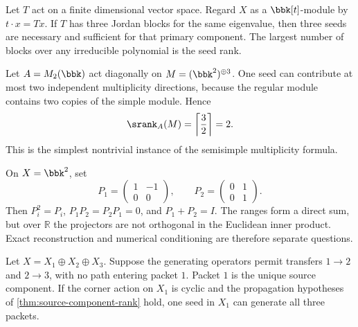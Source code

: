 \begin{microexample}[title={R1: one operator with several primary blocks}]
Let \(T\) act on a finite dimensional vector space.  Regard \(X\) as a \(\bbk[t]\)-module by \(t\cdot x=Tx\).  If \(T\) has three Jordan blocks for the same eigenvalue, then three seeds are necessary and sufficient for that primary component.  The largest number of blocks over any irreducible polynomial is the seed rank.
\end{microexample}

\begin{microexample}[title={R2: a matrix algebra with multiplicity}]
Let \(A=M_2(\bbk)\) act diagonally on \(M=(\bbk^2)^{\oplus3}\).  One seed can contribute at most two independent multiplicity directions, because the regular module contains two copies of the simple module.  Hence
\[
\srank_A(M)=\left\lceil\frac{3}{2}\right\rceil=2.
\]
This is the simplest nontrivial instance of the semisimple multiplicity formula.
\end{microexample}

\begin{microexample}[title={R3: an exact but oblique packet split}]
On \(X=\bbk^2\), set
\[
P_1=\begin{pmatrix}1&-1\\0&0\end{pmatrix},
\qquad
P_2=\begin{pmatrix}0&1\\0&1\end{pmatrix}.
\]
Then \(P_i^2=P_i\), \(P_1P_2=P_2P_1=0\), and \(P_1+P_2=I\).  The ranges form a direct sum, but over \(\mathbb R\) the projectors are not orthogonal in the Euclidean inner product.  Exact reconstruction and numerical conditioning are therefore separate questions.
\end{microexample}

\begin{microexample}[title={R4: a directed packet system}]
Let \(X=X_1\oplus X_2\oplus X_3\).  Suppose the generating operators permit transfers \(1\to2\) and \(2\to3\), with no path entering packet \(1\).  Packet \(1\) is the unique source component.  If the corner action on \(X_1\) is cyclic and the propagation hypotheses of \cref{thm:source-component-rank} hold, one seed in \(X_1\) can generate all three packets.
\end{microexample}

